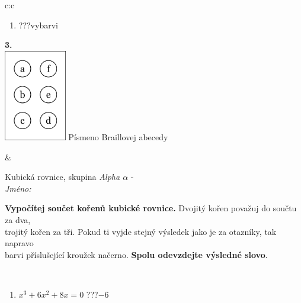 \documentclass[10pt]{report}
\begin{document}
\begin{tabular}{c:c}
\begin{minipage}[c][104.5mm][t]{0.5\linewidth}
\begin{center}
\begin{minipage}{0.79\linewidth}
\begin{center}
\begin{varwidth}{\linewidth}
\begin{enumerate}
\item \quad \dotfill\; ???\;\dotfill \quad vybarvi
\end{enumerate}
\end{varwidth}
\end{center}
\end{minipage}
\begin{minipage}{0.20\linewidth}
\begin{center}
{\Huge\bfseries 3.} \\[2mm]
\includegraphics[height=40mm]{../images/braille.png}
{\small Písmeno Braillovej abecedy}
\end{center}
\end{minipage}
\end{center}
\end{minipage}
&
\begin{minipage}[c][104.5mm][t]{0.5\linewidth}
\begin{center}
\vspace{7mm}
{\huge Kubická rovnice, skupina \textit{Alpha $\alpha$} -}\\[5mm]
\textit{Jméno:}\phantom{xxxxxxxxxxxxxxxxxxxxxxxxxxxxxxxxxxxxxxxxxxxxxxxxxxxxxxxxxxxxxxxxx}\\[5mm]
\begin{minipage}{0.95\linewidth}
\begin{center}
\textbf{Vypočítej součet kořenů kubické rovnice.} Dvojitý kořen považuj do součtu za dva,\\trojitý kořen za tři. Pokud ti vyjde stejný výsledek jako je za otazníky, tak napravo\\barvi příslušející kroužek načerno. \textbf{Spolu odevzdejte výsledné slovo}.
\end{center}
\end{minipage}
\\[1mm]
\begin{minipage}{0.79\linewidth}
\begin{center}
\begin{varwidth}{\linewidth}
\begin{enumerate}
\Large
\item $x^3+6x^2+8x=0$\quad \dotfill\; ???\;\dotfill \quad $-6$

\end{enumerate}
\end{varwidth}
\end{center}
\end{minipage}
\end{center}
\end{minipage}
\end{tabular}
\end{document}
